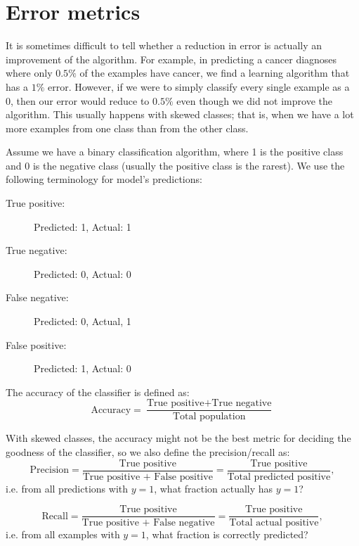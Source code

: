\documentclass[a4paper,11pt]{report}
\begin{document}
\section{Error metrics}

It is sometimes difficult to tell whether a reduction in error is actually an improvement of the algorithm. For example, in predicting a cancer diagnoses where only $0.5\%$ of the examples have cancer, we find a learning algorithm that has a $1\%$ error. However, if we were to simply classify every single example as a 0, then our error would reduce to $0.5\%$ even though we did not improve the algorithm.
This usually happens with skewed classes; that is, when we have a lot more examples from one class than from the other class.

Assume we have a binary classification algorithm, where 1 is the positive class and 0 is the negative class (usually the positive class is the rarest). We use the following terminology for model's predictions:
\begin{description}
  \item[True positive:] Predicted: 1, Actual: 1
  \item[True negative:] Predicted: 0, Actual: 0
  \item[False negative:] Predicted: 0, Actual, 1
  \item[False positive:] Predicted: 1, Actual: 0
\end{description}

The accuracy of the classifier is defined as:
\begin{equation}\label{df:accuracy}
\textrm{Accuracy} = \dfrac{\textrm{True positive} + \textrm{True negative}} {\textrm{Total population}}
\end{equation}

With skewed classes, the accuracy might not be the best metric for deciding the goodness of the classifier, so we also define the precision/recall as:
\begin{equation}\label{df:precision}
\textrm{Precision} = \dfrac{\textrm{True positive}}{\textrm{True positive + False positive}} = \dfrac{\textrm{True positive}}{\textrm{Total predicted positive}},
\end{equation}
i.e. from all predictions with $y=1$, what fraction actually has $y=1$?

\begin{equation}\label{df:recall}
\textrm{Recall} = \dfrac{\textrm{True positive}}{\textrm{True positive + False negative}} = \dfrac{\textrm{True positive}}{\textrm{Total actual positive}},
\end{equation}
i.e. from all examples with $y=1$, what fraction is correctly predicted?
\end{document}
